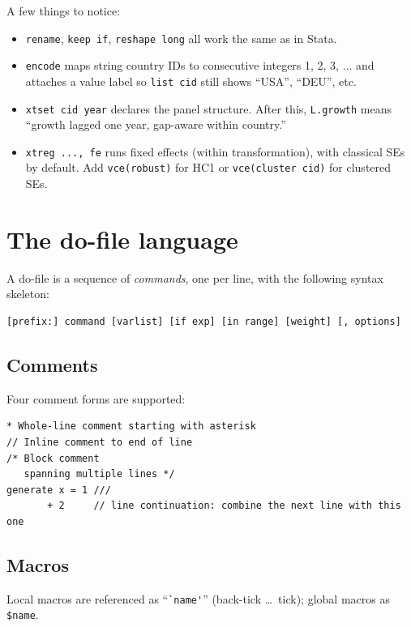 \documentclass[11pt,letterpaper]{article}
\begin{document}
A few things to notice:

\begin{itemize}[leftmargin=*]
\item \texttt{rename}, \texttt{keep if}, \texttt{reshape long} all work
the same as in Stata.
\item \texttt{encode} maps string country IDs to consecutive integers
1, 2, 3, $\ldots$ and attaches a value label so \texttt{list cid} still
shows ``USA'', ``DEU'', etc.
\item \texttt{xtset cid year} declares the panel structure.  After this,
\texttt{L.growth} means ``growth lagged one year, gap-aware within
country.''
\item \texttt{xtreg ..., fe} runs fixed effects (within transformation),
with classical SEs by default.  Add \texttt{vce(robust)} for HC1 or
\texttt{vce(cluster cid)} for clustered SEs.
\end{itemize}

\section{The do-file language}

A do-file is a sequence of \emph{commands}, one per line, with the
following syntax skeleton:

\begin{lstlisting}
[prefix:] command [varlist] [if exp] [in range] [weight] [, options]
\end{lstlisting}

\subsection{Comments}

Four comment forms are supported:

\begin{lstlisting}
* Whole-line comment starting with asterisk
// Inline comment to end of line
/* Block comment
   spanning multiple lines */
generate x = 1 ///
       + 2     // line continuation: combine the next line with this one
\end{lstlisting}

\subsection{Macros}

Local macros are referenced as ``\verb|`name'|'' (back-tick \ldots\ tick);
global macros as \texttt{\$name}.
\end{document}
